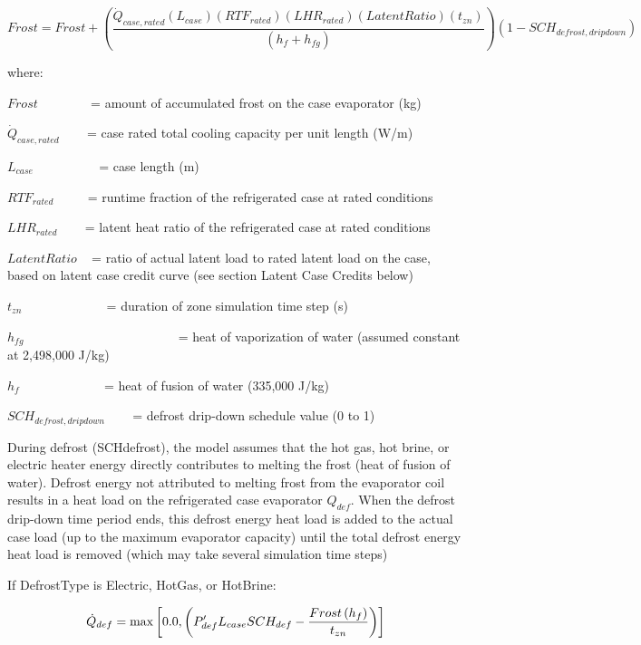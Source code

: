 \begin{equation}
Frost = Frost + \left( {\frac{{{{\dot Q}_{case,rated}}\left( {{L_{case}}} \right)\left( {RT{F_{rated}}} \right)\left( {LH{R_{rated}}} \right)\left( {LatentRatio} \right)\left( {{t_{zn}}} \right)}}{{\left( {{h_f} + {h_{fg}}} \right)}}} \right)\left( {1 - SC{H_{defrost,dripdown}}} \right)
\end{equation}

where:

\(Frost\) ~~~~~~~ = amount of accumulated frost on the case evaporator (kg)

\({\dot Q_{case,rated}}\) ~~~ = case rated total cooling capacity per unit length (W/m)

\({L_{case}}\) ~~~~~~~~~ = case length (m)

\(RT{F_{rated}}\) ~~~~ = runtime fraction of the refrigerated case at rated conditions

\(LH{R_{rated}}\) ~~~ = latent heat ratio of the refrigerated case at rated conditions

\(LatentRatio\) ~ = ratio of actual latent load to rated latent load on the case, based on latent case credit curve (see section Latent Case Credits below)

\({t_{zn}}\) ~~~~~~~~~~~~ = duration of zone simulation time step (s)

\({h_{fg}}\) ~~~~~~~~~~~~~~~~~~~~~~~ = heat of vaporization of water (assumed constant at 2,498,000 J/kg)

\({h_f}\) ~~~~~~~~~~~~ = heat of fusion of water (335,000 J/kg)

\(SC{H_{defrost,dripdown}}\) ~~~ = defrost drip-down schedule value (0 to 1)

During defrost (SCHdefrost), the model assumes that the hot gas, hot brine, or electric heater energy directly contributes to melting the frost (heat of fusion of water). Defrost energy not attributed to melting frost from the evaporator coil results in a heat load on the refrigerated case evaporator \(Q_{def}\). When the defrost drip-down time period ends, this defrost energy heat load is added to the actual case load (up to the maximum evaporator capacity) until the total defrost energy heat load is removed (which may take several simulation time steps)

If DefrostType is Electric, HotGas, or HotBrine:

\begin{equation}
  \dot{Q}_{def} = \max\left[0.0,\left(P_{def}' L_{case} SCH_{def} - \frac{Frost\left(h_f\right)}{t_{zn}}\right)\right]
\end{equation}

